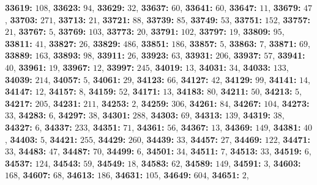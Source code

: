 \textsf{\bfseries 33619:} $108$, \textsf{\bfseries 33623:} $94$, \textsf{\bfseries 33629:} $32$, \textsf{\bfseries 33637:} $60$, \textsf{\bfseries 33641:} $60$, \textsf{\bfseries 33647:} $11$, \textsf{\bfseries 33679:} $47$, \textsf{\bfseries 33703:} $271$, \textsf{\bfseries 33713:} $21$, \textsf{\bfseries 33721:} $88$, \textsf{\bfseries 33739:} $85$, \textsf{\bfseries 33749:} $53$, \textsf{\bfseries 33751:} $152$, \textsf{\bfseries 33757:} $21$, \textsf{\bfseries 33767:} $5$, \textsf{\bfseries 33769:} $103$, \textsf{\bfseries 33773:} $20$, \textsf{\bfseries 33791:} $102$, \textsf{\bfseries 33797:} $19$, \textsf{\bfseries 33809:} $95$, \textsf{\bfseries 33811:} $41$, \textsf{\bfseries 33827:} $26$, \textsf{\bfseries 33829:} $486$, \textsf{\bfseries 33851:} $186$, \textsf{\bfseries 33857:} $5$, \textsf{\bfseries 33863:} $7$, \textsf{\bfseries 33871:} $69$, \textsf{\bfseries 33889:} $163$, \textsf{\bfseries 33893:} $98$, \textsf{\bfseries 33911:} $26$, \textsf{\bfseries 33923:} $63$, \textsf{\bfseries 33931:} $206$, \textsf{\bfseries 33937:} $57$, \textsf{\bfseries 33941:} $40$, \textsf{\bfseries 33961:} $19$, \textsf{\bfseries 33967:} $12$, \textsf{\bfseries 33997:} $245$, \textsf{\bfseries 34019:} $13$, \textsf{\bfseries 34031:} $34$, \textsf{\bfseries 34033:} $133$, \textsf{\bfseries 34039:} $214$, \textsf{\bfseries 34057:} $5$, \textsf{\bfseries 34061:} $29$, \textsf{\bfseries 34123:} $66$, \textsf{\bfseries 34127:} $42$, \textsf{\bfseries 34129:} $99$, \textsf{\bfseries 34141:} $14$, \textsf{\bfseries 34147:} $12$, \textsf{\bfseries 34157:} $8$, \textsf{\bfseries 34159:} $52$, \textsf{\bfseries 34171:} $13$, \textsf{\bfseries 34183:} $80$, \textsf{\bfseries 34211:} $50$, \textsf{\bfseries 34213:} $5$, \textsf{\bfseries 34217:} $205$, \textsf{\bfseries 34231:} $211$, \textsf{\bfseries 34253:} $2$, \textsf{\bfseries 34259:} $306$, \textsf{\bfseries 34261:} $84$, \textsf{\bfseries 34267:} $104$, \textsf{\bfseries 34273:} $33$, \textsf{\bfseries 34283:} $6$, \textsf{\bfseries 34297:} $38$, \textsf{\bfseries 34301:} $288$, \textsf{\bfseries 34303:} $69$, \textsf{\bfseries 34313:} $139$, \textsf{\bfseries 34319:} $38$, \textsf{\bfseries 34327:} $6$, \textsf{\bfseries 34337:} $233$, \textsf{\bfseries 34351:} $71$, \textsf{\bfseries 34361:} $56$, \textsf{\bfseries 34367:} $13$, \textsf{\bfseries 34369:} $149$, \textsf{\bfseries 34381:} $40$, \textsf{\bfseries 34403:} $5$, \textsf{\bfseries 34421:} $255$, \textsf{\bfseries 34429:} $260$, \textsf{\bfseries 34439:} $33$, \textsf{\bfseries 34457:} $27$, \textsf{\bfseries 34469:} $122$, \textsf{\bfseries 34471:} $33$, \textsf{\bfseries 34483:} $47$, \textsf{\bfseries 34487:} $70$, \textsf{\bfseries 34499:} $6$, \textsf{\bfseries 34501:} $34$, \textsf{\bfseries 34511:} $7$, \textsf{\bfseries 34513:} $33$, \textsf{\bfseries 34519:} $6$, \textsf{\bfseries 34537:} $124$, \textsf{\bfseries 34543:} $59$, \textsf{\bfseries 34549:} $18$, \textsf{\bfseries 34583:} $62$, \textsf{\bfseries 34589:} $149$, \textsf{\bfseries 34591:} $3$, \textsf{\bfseries 34603:} $168$, \textsf{\bfseries 34607:} $68$, \textsf{\bfseries 34613:} $186$, \textsf{\bfseries 34631:} $105$, \textsf{\bfseries 34649:} $604$, \textsf{\bfseries 34651:} $2$, 
